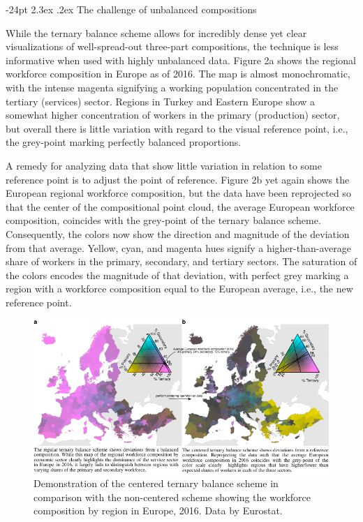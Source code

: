 \documentclass[10pt,twoside,reqno]{article}
\makeatletter
\def\cnstmaxfigwidth{
      \ifdim \Gin@nat@width>\linewidth
        \linewidth
      \else \Gin@nat@width
      \fi
    }
\let\Oldincludegraphics\includegraphics
\renewcommand{\includegraphics}[1]{\Oldincludegraphics[width=\cnstmaxfigwidth]{#1}}
\renewcommand\section{\@startsection {section}{1}{\z@}%
                                   {-24pt}%
                                   {2.3ex \@plus.2ex}%
                                   {\normalfont\large\bfseries}}
\makeatother
\begin{document}
\hypertarget{the-challenge-of-unbalanced-compositions}{%
\section{The challenge of unbalanced
compositions}\label{the-challenge-of-unbalanced-compositions}}

While the ternary balance scheme allows for incredibly dense yet clear
visualizations of well-spread-out three-part compositions, the technique
is less informative when used with highly unbalanced data. Figure 2a
shows the regional workforce composition in Europe as of 2016. The map
is almost monochromatic, with the intense magenta signifying a working
population concentrated in the tertiary (services) sector. Regions in
Turkey and Eastern Europe show a somewhat higher concentration of
workers in the primary (production) sector, but overall there is little
variation with regard to the visual reference point, i.e., the
grey-point marking perfectly balanced proportions.

A remedy for analyzing data that show little variation in relation to
some reference point is to adjust the point of reference. Figure 2b yet
again shows the European regional workforce composition, but the data
have been reprojected so that the center of the compositional point
cloud, the average European workforce composition, coincides with the
grey-point of the ternary balance scheme. Consequently, the colors now
show the direction and magnitude of the deviation from that average.
Yellow, cyan, and magenta hues signify a higher-than-average share of
workers in the primary, secondary, and tertiary sectors. The saturation
of the colors encodes the magnitude of that deviation, with perfect grey
marking a region with a workforce composition equal to the European
average, i.e., the new reference point.

\begin{figure}
\centering
\includegraphics{figure2.pdf}
\caption{Demonstration of the centered ternary balance scheme in
comparison with the non-centered scheme showing the workforce
composition by region in Europe, 2016. Data by Eurostat.}
\end{figure}
\end{document}
